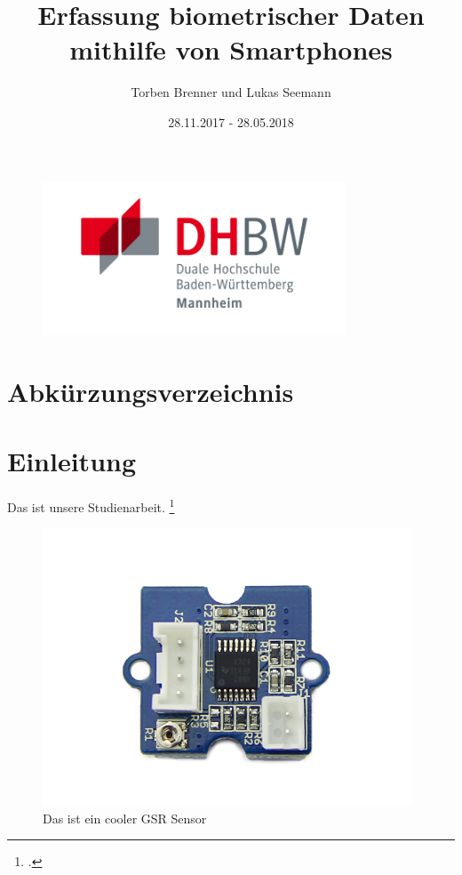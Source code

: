 \documentclass[12pt,titlepage,ngerman]{article}
\begin{document}
\begin{titlepage}
	\begin{figure}
		\centering
		\includegraphics[width=9cm]{Bilder/DHBW_MA_Logo.jpg}
	\end{figure}%
	\title{Erfassung biometrischer Daten mithilfe von Smartphones}	
	\date{28.11.2017 - 28.05.2018}
	\author{Torben Brenner und Lukas Seemann}
	\maketitle
\end{titlepage}
\singlespacing
{}
\tableofcontents
\newpage
\section*{Abkürzungsverzeichnis}
\begin{acronym}[*********]
\end{acronym}
\newpage
{}
\listoffigures
\newpage

\listoftables
\newpage

\onehalfspacing
\section{Einleitung}
Das ist unsere Studienarbeit. \footcite[Vgl.][S. 9000]{Test123}

\begin{figure}[h]
	\centering
	\includegraphics[width=11cm]{Bilder/sensor.jpg}
	\caption{Das ist ein cooler GSR Sensor}
\end{figure}%
\newpage

\newpage
\end{document}
